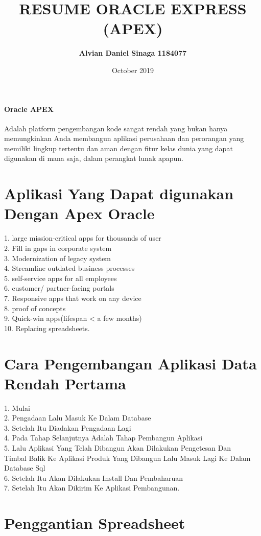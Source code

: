 \documentclass [12pt, times new roman, a4paper]{article}
\title{RESUME ORACLE EXPRESS (APEX)}
\author{ \textbf{Alvian Daniel Sinaga 1184077}}
\date{October 2019}
\begin{document}
\maketitle
\paragraph{Oracle APEX}Adalah platform pengembangan kode sangat rendah yang bukan hanya memungkinkan Anda membangun aplikasi perusahaan dan perorangan yang memiliki lingkup tertentu dan aman dengan fitur kelas dunia yang dapat digunakan di mana saja, dalam perangkat lunak apapun.

\section{Aplikasi Yang Dapat digunakan Dengan Apex Oracle}
1. large mission-critical apps for thousands of user\\
2. Fill in gaps in corporate system\\
3. Modernization of legacy system\\
4. Streamline outdated business processes\\
5. self-service apps for all employees\\
6. customer/ partner-facing portals\\
7. Responsive apps that work on any device\\
8. proof of concepts\\
9. Quick-win apps(lifespan < a few months)\\
10. Replacing spreadsheets.
\section{Cara Pengembangan Aplikasi Data Rendah
Pertama}
1. Mulai\\
2. Pengadaan Lalu Masuk Ke Dalam Database\\
3. Setelah Itu Diadakan Pengadaan Lagi\\
4. Pada Tahap Selanjutnya Adalah Tahap Pembangun Aplikasi\\
5. Lalu Aplikasi Yang Telah Dibangun Akan Dilakukan Pengetesan Dan\\ Timbal Balik Ke Aplikasi Produk Yang Dibangun Lalu Masuk Lagi Ke Dalam Database Sql\\
6. Setelah Itu Akan Dilakukan Install Dan Pembaharuan\\
7. Setelah Itu Akan Dikirim Ke Aplikasi Pembangunan.
\section{Penggantian Spreadsheet}
\end{document}
